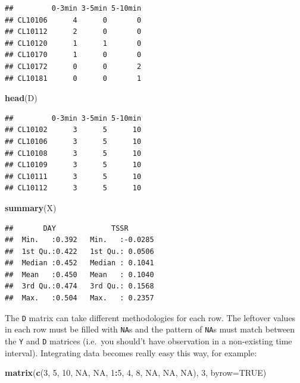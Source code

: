 \documentclass[12pt,]{book}
\newenvironment{Shaded}{\begin{snugshade}}{\end{snugshade}}
\newcommand{\DataTypeTok}[1]{\textcolor[rgb]{0.13,0.29,0.53}{#1}}
\newcommand{\DecValTok}[1]{\textcolor[rgb]{0.00,0.00,0.81}{#1}}
\newcommand{\KeywordTok}[1]{\textcolor[rgb]{0.13,0.29,0.53}{\textbf{#1}}}
\newcommand{\NormalTok}[1]{#1}
\newcommand{\OperatorTok}[1]{\textcolor[rgb]{0.81,0.36,0.00}{\textbf{#1}}}
\newcommand{\OtherTok}[1]{\textcolor[rgb]{0.56,0.35,0.01}{#1}}
\begin{document}
\begin{verbatim}
##         0-3min 3-5min 5-10min
## CL10106      4      0       0
## CL10112      2      0       0
## CL10120      1      1       0
## CL10170      1      0       0
## CL10172      0      0       2
## CL10181      0      0       1
\end{verbatim}

\begin{Shaded}
\begin{Highlighting}[]
\KeywordTok{head}\NormalTok{(D)}
\end{Highlighting}
\end{Shaded}

\begin{verbatim}
##         0-3min 3-5min 5-10min
## CL10102      3      5      10
## CL10106      3      5      10
## CL10108      3      5      10
## CL10109      3      5      10
## CL10111      3      5      10
## CL10112      3      5      10
\end{verbatim}

\begin{Shaded}
\begin{Highlighting}[]
\KeywordTok{summary}\NormalTok{(X)}
\end{Highlighting}
\end{Shaded}

\begin{verbatim}
##       DAY             TSSR        
##  Min.   :0.392   Min.   :-0.0285  
##  1st Qu.:0.422   1st Qu.: 0.0506  
##  Median :0.452   Median : 0.1041  
##  Mean   :0.450   Mean   : 0.1040  
##  3rd Qu.:0.474   3rd Qu.: 0.1568  
##  Max.   :0.504   Max.   : 0.2357
\end{verbatim}

The \texttt{D} matrix can take different methodologies for each row.
The leftover values in each row must be filled with \texttt{NA}s
and the pattern of \texttt{NA}s must match between the \texttt{Y} and \texttt{D} matrices
(i.e.~you should't have observation in a non-existing time interval).
Integrating data becomes really easy this way, for example:

\begin{Shaded}
\begin{Highlighting}[]
\KeywordTok{matrix}\NormalTok{(}\KeywordTok{c}\NormalTok{(}\DecValTok{3}\NormalTok{, }\DecValTok{5}\NormalTok{, }\DecValTok{10}\NormalTok{, }\OtherTok{NA}\NormalTok{, }\OtherTok{NA}\NormalTok{, }\DecValTok{1}\OperatorTok{:}\DecValTok{5}\NormalTok{, }\DecValTok{4}\NormalTok{, }\DecValTok{8}\NormalTok{, }\OtherTok{NA}\NormalTok{, }\OtherTok{NA}\NormalTok{, }\OtherTok{NA}\NormalTok{), }\DecValTok{3}\NormalTok{, }\DataTypeTok{byrow=}\OtherTok{TRUE}\NormalTok{)}
\end{Highlighting}
\end{Shaded}
\end{document}
